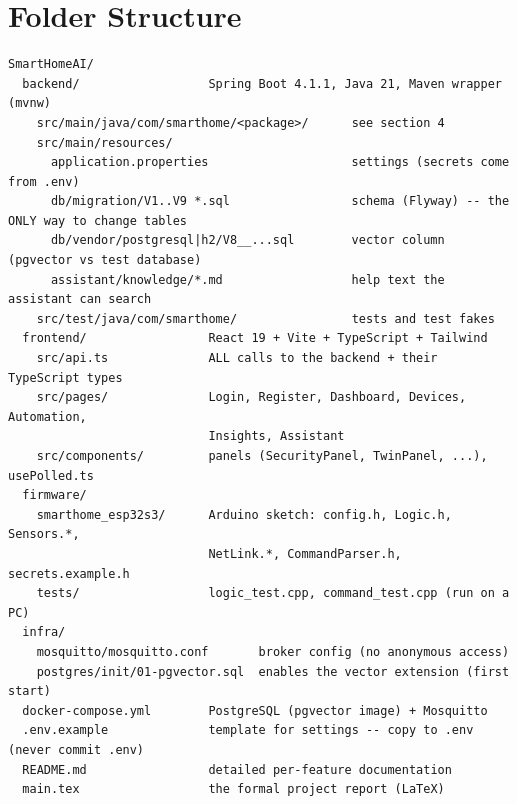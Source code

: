 \documentclass[11pt,a4paper]{article}
\begin{document}
\section{Folder Structure}
\begin{lstlisting}
SmartHomeAI/
  backend/                  Spring Boot 4.1.1, Java 21, Maven wrapper (mvnw)
    src/main/java/com/smarthome/<package>/      see section 4
    src/main/resources/
      application.properties                    settings (secrets come from .env)
      db/migration/V1..V9 *.sql                 schema (Flyway) -- the ONLY way to change tables
      db/vendor/postgresql|h2/V8__...sql        vector column (pgvector vs test database)
      assistant/knowledge/*.md                  help text the assistant can search
    src/test/java/com/smarthome/                tests and test fakes
  frontend/                 React 19 + Vite + TypeScript + Tailwind
    src/api.ts              ALL calls to the backend + their TypeScript types
    src/pages/              Login, Register, Dashboard, Devices, Automation,
                            Insights, Assistant
    src/components/         panels (SecurityPanel, TwinPanel, ...), usePolled.ts
  firmware/
    smarthome_esp32s3/      Arduino sketch: config.h, Logic.h, Sensors.*,
                            NetLink.*, CommandParser.h, secrets.example.h
    tests/                  logic_test.cpp, command_test.cpp (run on a PC)
  infra/
    mosquitto/mosquitto.conf       broker config (no anonymous access)
    postgres/init/01-pgvector.sql  enables the vector extension (first start)
  docker-compose.yml        PostgreSQL (pgvector image) + Mosquitto
  .env.example              template for settings -- copy to .env (never commit .env)
  README.md                 detailed per-feature documentation
  main.tex                  the formal project report (LaTeX)
\end{lstlisting}

\end{document}
